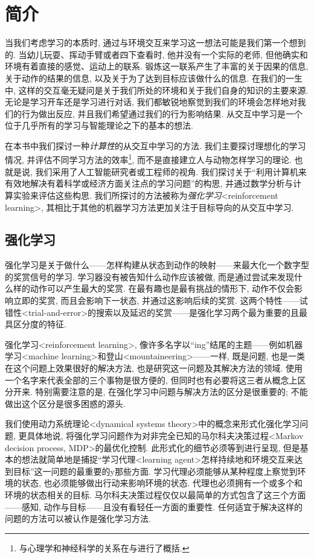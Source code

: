 \chapter{简介}\label{chap:1}

当我们考虑学习的本质时, 通过与环境交互来学习这一想法可能是我们第一个想到的. 当幼儿玩耍、挥动手臂或者四下查看时, 他并没有一个实际的老师, 但他确实和环境有着直接的感觉、运动上的联系. 锻炼这一联系产生了丰富的关于因果的信息, 关于动作的结果的信息, 以及关于为了达到目标应该做什么的信息. 在我们的一生中, 这样的交互毫无疑问是关于我们所处的环境和关于我们自身的知识的主要来源. 无论是学习开车还是学习进行对话, 我们都敏锐地察觉到我们的环境会怎样地对我们的行为做出反应, 并且我们希望通过我们的行为影响结果. 从交互中学习是一个位于几乎所有的学习与智能理论之下的基本的想法.

在本书中我们探讨一种\emph{计算性}的从交互中学习的方法. 我们主要探讨理想化的学习情况, 并评估不同学习方法的效率\footnote{与心理学和神经科学的关系在与进行了概括.}, 而不是直接建立人与动物怎样学习的理论. 也就是说, 我们采用了人工智能研究者或工程师的视角. 我们探讨关于``利用计算机来有效地解决有着科学或经济方面关注点的学习问题''的构思, 并通过数学分析与计算实验来评估这些构思. 我们所探讨的方法被称为\emph{强化学习}<reinforcement learning>, 其相比于其他的机器学习方法更加关注于目标导向的从交互中学习.

\section{强化学习}\label{sec:1.1}

强化学习是关于做什么——怎样构建从状态到动作的映射——来最大化一个数字型的奖赏信号的学习. 学习器没有被告知什么动作应该被做, 而是通过尝试来发现什么样的动作可以产生最大的奖赏. 在最有趣也是最有挑战的情形下, 动作不仅会影响立即的奖赏, 而且会影响下一状态, 并通过这影响后续的奖赏. 这两个特性——试错性<trial-and-error>的搜索以及延迟的奖赏——是强化学习两个最为重要的且最具区分度的特征.

强化学习<reinforcement learning>, 像许多名字以``ing''结尾的主题——例如机器学习<machine learning>和登山<mountaineering>——一样, 既是问题, 也是一类在这个问题上效果很好的解决方法, 也是研究这一问题及其解决方法的领域. 使用一个名字来代表全部的三个事物是很方便的, 但同时也有必要将这三者从概念上区分开来. 特别需要注意的是, 在强化学习中问题与解决方法的区分是很重要的; 不能做出这个区分是很多困惑的源头.

我们使用动力系统理论<dynamical systems theory>中的概念来形式化强化学习问题, 更具体地说, 将强化学习问题作为对非完全已知的马尔科夫决策过程<Markov decision process, MDP>的最优化控制. 此形式化的细节必须等到进行呈现, 但是基本的想法就简单地是捕捉``学习代理<learning agent>怎样持续地和环境交互来达到目标''这一问题的最重要的y那些方面. 学习代理必须能够从某种程度上察觉到环境的状态, 也必须能够做出行动来影响环境的状态. 代理也必须拥有一个或多个和环境的状态相关的目标. 马尔科夫决策过程仅仅以最简单的方式包含了这三个方面——感知, 动作与目标——且没有看轻任一方面的重要性. 任何适宜于解决这样的问题的方法可以被认作是强化学习方法.

